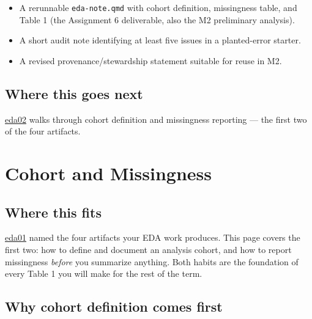 \documentclass[
  letterpaper,
  DIV=11,
  numbers=noendperiod,
  oneside]{scrreprt}
\providecommand{\tightlist}{%
  \setlength{\itemsep}{0pt}\setlength{\parskip}{0pt}}
\begin{document}

\begin{itemize}
\tightlist
\item
  A rerunnable \texttt{eda-note.qmd} with cohort definition, missingness
  table, and Table 1 (the Assignment 6 deliverable, also the M2
  preliminary analysis).
\item
  A short audit note identifying at least five issues in a planted-error
  starter.
\item
  A revised provenance/stewardship statement suitable for reuse in M2.
\end{itemize}

\section*{Where this goes next}\label{where-this-goes-next-7}


\href{eda02-cohort-and-missingness.qmd}{eda02} walks through cohort
definition and missingness reporting --- the first two of the four
artifacts.

\chapter*{Cohort and Missingness}\label{cohort-and-missingness}


\section*{Where this fits}\label{where-this-fits-6}


\hyperref[eda-as-evidence-stewardship]{eda01} named the four artifacts
your EDA work produces. This page covers the first two: how to define
and document an analysis cohort, and how to report missingness
\emph{before} you summarize anything. Both habits are the foundation of
every Table 1 you will make for the rest of the term.

\section*{Why cohort definition comes
first}\label{why-cohort-definition-comes-first}
\end{document}
